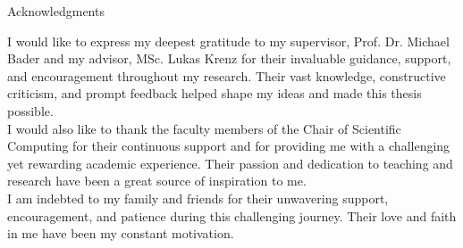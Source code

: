 \thispagestyle{empty}

\vspace*{20mm}

\begin{center}
    { Acknowledgments}
\end{center}

\vspace{10mm}

I would like to express my deepest gratitude to my supervisor, Prof. Dr. Michael Bader and my advisor, MSc. Lukas Krenz 
for their invaluable guidance, support, and encouragement throughout my research. 
Their vast knowledge, constructive criticism, and prompt feedback helped shape my ideas and made this thesis possible. \\

I would also like to thank the faculty members of the Chair of Scientific Computing for their continuous support and for providing 
me with a challenging yet rewarding academic experience. Their passion and dedication to teaching and research have been a 
great source of inspiration to me. \\

I am indebted to my family and friends for their unwavering support, encouragement, and patience during this challenging 
journey. Their love and faith in me have been my constant motivation. \\

\cleardoublepage{}
